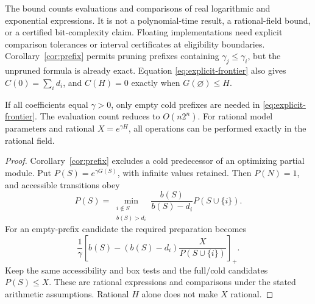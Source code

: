 The bound counts evaluations and comparisons of real logarithmic and
exponential expressions. It is not a polynomial-time result, a rational-field
bound, or a certified bit-complexity claim. Floating implementations need
explicit comparison tolerances or interval certificates at eligibility
boundaries. Corollary~\ref{cor:prefix} permits pruning prefixes containing
\(\gamma_j\leq\gamma_i\), but the unpruned formula is already exact.
Equation \eqref{eq:explicit-frontier} also gives
\(C(0)=\sum_i d_i\), and \(C(H)=0\) exactly when \(G(\varnothing)\leq H\).

\begin{corollary}
\label{cor:common-rate}
If all coefficients equal \(\gamma>0\), only empty cold prefixes are needed
in \eqref{eq:explicit-frontier}. The evaluation count reduces to
\(O(n2^n)\). For rational model parameters and rational
\(X=e^{\gamma H}\), all operations can be performed exactly in the rational
field.
\end{corollary}
\begin{proof}
Corollary~\ref{cor:prefix} excludes a cold predecessor of an optimizing
partial module. Put \(P(S)=e^{\gamma G(S)}\), with infinite values retained.
Then \(P(N)=1\), and accessible transitions obey
\[
 P(S)=\min_{\substack{i\notin S\\b(S)>d_i}}
       \frac{b(S)}{b(S)-d_i}P(S\cup\{i\}).
\]
For an empty-prefix candidate the required preparation becomes
\[
 \frac1\gamma
 \left[b(S)-(b(S)-d_i)\frac{X}{P(S\cup\{i\})}\right]_+.
\]
Keep the same accessibility and box tests and the full/cold candidates
\(P(S)\leq X\). These are rational expressions and comparisons under the
stated arithmetic assumptions. Rational \(H\) alone does not make \(X\)
rational.
\end{proof}

